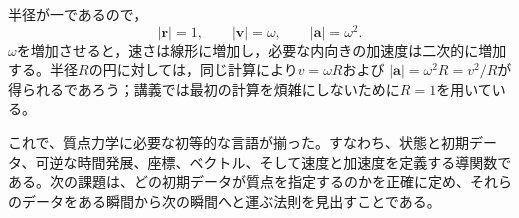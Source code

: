 半径が一であるので，
\begin{equation}
  \lvert\mathbf r\rvert=1,
  \qquad
  \lvert\mathbf v\rvert=\omega,
  \qquad
  \lvert\mathbf a\rvert=\omega^2.
\end{equation}
\(\omega\)を増加させると，速さは線形に増加し，必要な内向きの加速度は二次的に増加する。半径\(R\)の円に対しては，同じ計算により\(v=\omega R\)および
\(\lvert\mathbf a\rvert=\omega^2R=v^2/R\)が得られるであろう；講義では最初の計算を煩雑にしないために\(R=1\)を用いている。

これで、質点力学に必要な初等的な言語が揃った。すなわち、状態と初期データ、可逆な時間発展、座標、ベクトル、そして速度と加速度を定義する導関数である。次の課題は、どの初期データが質点を指定するのかを正確に定め、それらのデータをある瞬間から次の瞬間へと運ぶ法則を見出すことである。